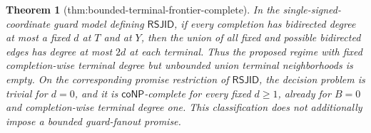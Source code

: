 \documentclass{article}
\newtheorem{theorem}{Theorem}
\begin{document}
\begin{theorem}[thm:bounded-terminal-frontier-complete]\label{thm:bounded-terminal-frontier-complete}
In the single-signed-coordinate guard model defining \(\mathsf{RSJID}\), if every completion has bidirected degree at most a fixed \(d\) at \(T\) and at \(Y\), then the union of all fixed and possible bidirected edges has degree at most \(2d\) at each terminal. Thus the proposed regime with fixed completion-wise terminal degree but unbounded union terminal neighborhoods is empty. On the corresponding promise restriction of \(\mathsf{RSJID}\), the decision problem is trivial for \(d=0\), and it is \(\mathsf{coNP}\)-complete for every fixed \(d\ge1\), already for \(B=0\) and completion-wise terminal degree one. This classification does not additionally impose a bounded guard-fanout promise.
\end{theorem}
\end{document}

